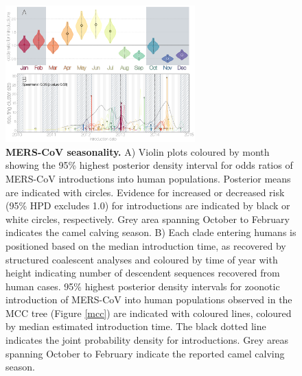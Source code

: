 \documentclass[11pt,oneside,letterpaper]{article}
\begin{document}
\begin{figure}[h]
\centering
	\includegraphics[width=0.65\textwidth]{figures/mers_seasonality.png}
	\caption{\textbf{MERS-CoV seasonality.}
A) Violin plots coloured by month showing the 95\% highest posterior density interval for odds ratios of MERS-CoV introductions into human populations.
Posterior means are indicated with circles.
Evidence for increased or decreased risk (95\% HPD excludes 1.0) for introductions are indicated by black or white circles, respectively.
Grey area spanning October to February indicates the camel calving season.
B) Each clade entering humans is positioned based on the median introduction time, as recovered by structured coalescent analyses and coloured by time of year with height indicating number of descendent sequences recovered from human cases.
95\% highest posterior density intervals for zoonotic introduction of MERS-CoV into human populations observed in the MCC tree (Figure \ref{mcc}) are indicated with coloured lines, coloured by median estimated introduction time.
The black dotted line indicates the joint probability density for introductions.
Grey areas spanning October to February indicate the reported camel calving season.
	}
	\label{seasonality}
\end{figure}

%
\end{document}
